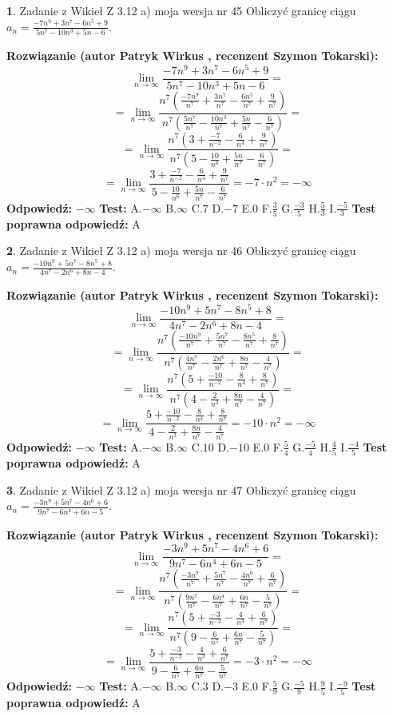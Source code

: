 \documentclass[12pt, a4paper]{article}
\theoremstyle{definition} %
\newtheorem{zad}{}
\newcommand{\zadStart}[1]{\begin{zad}#1\newline}
\newcommand{\zadStop}{\end{zad}}
\newcommand{\rozwStart}[2]{\noindent \textbf{Rozwiązanie (autor #1 , recenzent #2): }\newline}
\newcommand{\rozwStop}{\newline}
\newcommand{\odpStart}{\noindent \textbf{Odpowiedź:}\newline}
\newcommand{\odpStop}{\newline}
\newcommand{\testStart}{\noindent \textbf{Test:}\newline}
\newcommand{\testStop}{\newline}
\newcommand{\kluczStart}{\noindent \textbf{Test poprawna odpowiedź:}\newline}
\newcommand{\kluczStop}{\newline}
\begin{document}
\zadStart{Zadanie z Wikieł Z 3.12 a) moja wersja nr 45}
Obliczyć granicę ciągu $a_{n}=\frac{-7n^{9}+3n^{7}-6n^{5}+9}{5n^{7}-10n^{3}+5n-6}$.
\zadStop
\rozwStart{Patryk Wirkus}{Szymon Tokarski}
$$\lim\limits_{n\to\infty}\frac{-7n^{9}+3n^{7}-6n^{5}+9}{5n^{7}-10n^{3}+5n-6}=$$
$$=\lim\limits_{n\to\infty}\frac{n^{7}\left(\frac{-7n^{9}}{n^{7}}+\frac{3n^{7}}{n^{7}}-\frac{6n^{5}}{n^{7}}+\frac{9}{n^{7}}\right)}{n^{7}\left(\frac{5n^{7}}{n^{7}}-\frac{10n^{3}}{n^{7}}+\frac{5n}{n^{7}}-\frac{6}{n^{7}}\right)}=$$
$$=\lim\limits_{n\to\infty}\frac{n^{7}\left(3+\frac{-7}{n^{-2}}-\frac{6}{n^{4}}+\frac{9}{n^{7}}\right)}
{n^{7}\left(5-\frac{10}{n^{6}}+\frac{5n}{n^{7}}-\frac{6}{n^{7}}\right)}=$$
$$=\lim\limits_{n\to\infty}\frac{3+\frac{-7}{n^{-2}}-\frac{6}{n^{4}}+\frac{9}{n^{7}}}{5-\frac{10}{n^{6}}+\frac{5n}{n^{7}}-\frac{6}{n^{7}}}=-7\cdot n^{2} = -\infty$$
\rozwStop
\odpStart
$-\infty$
\odpStop
\testStart
A.$-\infty$
B.$\infty$
C.$7$
D.$-7$
E.$0$
F.$\frac{3}{5}$
G.$\frac{-3}{5}$
H.$\frac{5}{3}$
I.$\frac{-5}{3}$
\testStop
\kluczStart
A
\kluczStop



\zadStart{Zadanie z Wikieł Z 3.12 a) moja wersja nr 46}
Obliczyć granicę ciągu $a_{n}=\frac{-10n^{9}+5n^{7}-8n^{5}+8}{4n^{7}-2n^{6}+8n-4}$.
\zadStop
\rozwStart{Patryk Wirkus}{Szymon Tokarski}
$$\lim\limits_{n\to\infty}\frac{-10n^{9}+5n^{7}-8n^{5}+8}{4n^{7}-2n^{6}+8n-4}=$$
$$=\lim\limits_{n\to\infty}\frac{n^{7}\left(\frac{-10n^{9}}{n^{7}}+\frac{5n^{7}}{n^{7}}-\frac{8n^{5}}{n^{7}}+\frac{8}{n^{7}}\right)}{n^{7}\left(\frac{4n^{7}}{n^{7}}-\frac{2n^{6}}{n^{7}}+\frac{8n}{n^{7}}-\frac{4}{n^{7}}\right)}=$$
$$=\lim\limits_{n\to\infty}\frac{n^{7}\left(5+\frac{-10}{n^{-2}}-\frac{8}{n^{4}}+\frac{8}{n^{7}}\right)}
{n^{7}\left(4-\frac{2}{n^{3}}+\frac{8n}{n^{7}}-\frac{4}{n^{7}}\right)}=$$
$$=\lim\limits_{n\to\infty}\frac{5+\frac{-10}{n^{-2}}-\frac{8}{n^{4}}+\frac{8}{n^{7}}}{4-\frac{2}{n^{3}}+\frac{8n}{n^{7}}-\frac{4}{n^{7}}}=-10\cdot n^{2} = -\infty$$
\rozwStop
\odpStart
$-\infty$
\odpStop
\testStart
A.$-\infty$
B.$\infty$
C.$10$
D.$-10$
E.$0$
F.$\frac{5}{4}$
G.$\frac{-5}{4}$
H.$\frac{4}{5}$
I.$\frac{-4}{5}$
\testStop
\kluczStart
A
\kluczStop



\zadStart{Zadanie z Wikieł Z 3.12 a) moja wersja nr 47}
Obliczyć granicę ciągu $a_{n}=\frac{-3n^{9}+5n^{7}-4n^{6}+6}{9n^{7}-6n^{4}+6n-5}$.
\zadStop
\rozwStart{Patryk Wirkus}{Szymon Tokarski}
$$\lim\limits_{n\to\infty}\frac{-3n^{9}+5n^{7}-4n^{6}+6}{9n^{7}-6n^{4}+6n-5}=$$
$$=\lim\limits_{n\to\infty}\frac{n^{7}\left(\frac{-3n^{9}}{n^{7}}+\frac{5n^{7}}{n^{7}}-\frac{4n^{6}}{n^{7}}+\frac{6}{n^{7}}\right)}{n^{7}\left(\frac{9n^{7}}{n^{7}}-\frac{6n^{4}}{n^{7}}+\frac{6n}{n^{7}}-\frac{5}{n^{7}}\right)}=$$
$$=\lim\limits_{n\to\infty}\frac{n^{7}\left(5+\frac{-3}{n^{-2}}-\frac{4}{n^{3}}+\frac{6}{n^{7}}\right)}
{n^{7}\left(9-\frac{6}{n^{5}}+\frac{6n}{n^{7}}-\frac{5}{n^{7}}\right)}=$$
$$=\lim\limits_{n\to\infty}\frac{5+\frac{-3}{n^{-2}}-\frac{4}{n^{3}}+\frac{6}{n^{7}}}{9-\frac{6}{n^{5}}+\frac{6n}{n^{7}}-\frac{5}{n^{7}}}=-3\cdot n^{2} = -\infty$$
\rozwStop
\odpStart
$-\infty$
\odpStop
\testStart
A.$-\infty$
B.$\infty$
C.$3$
D.$-3$
E.$0$
F.$\frac{5}{9}$
G.$\frac{-5}{9}$
H.$\frac{9}{5}$
I.$\frac{-9}{5}$
\testStop
\kluczStart
A
\kluczStop
\end{document}
